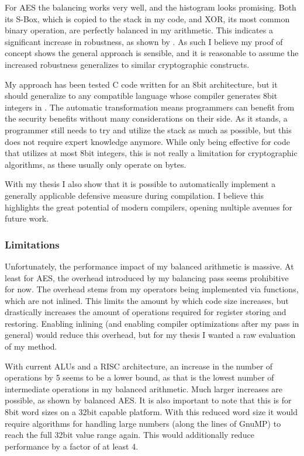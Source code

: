 For AES the balancing works very well, and the histogram looks promising.
Both its S-Box, which is copied to the stack in my code, and XOR, its most common binary operation, are perfectly balanced in my arithmetic.
This indicates a significant increase in robustness, as shown by .
As such I believe my proof of concept shows the general approach is sensible, and it is reasonable to assume the increased robustness generalizes to similar cryptographic constructs.

My approach has been tested C code written for an 8bit architecture, but it should generalize to any \llvm{} compatible language whose compiler generates 8bit integers in \ir{}.
The automatic transformation means programmers can benefit from the security benefits without many considerations on their side.
As it stands, a programmer still needs to try and utilize the stack as much as possible, but this does not require expert knowledge anymore.
While only being effective for code that utilizes at most 8bit integers, this is not really a limitation for cryptographic algorithms, as these usually only operate on bytes.

With my thesis I also show that it is possible to automatically implement a generally applicable defensive measure during compilation.
I believe this highlights the great potential of modern compilers, opening multiple avenues for future work.

\subsubsection{Limitations}
Unfortunately, the performance impact of my balanced arithmetic is massive.
At least for AES, the overhead introduced by my balancing pass seems prohibitive for now.
The overhead stems from my operators being implemented via functions, which are not inlined.
This limits the amount by which code size increases, but drastically increases the amount of operations required for register storing and restoring.
Enabling inlining (and enabling compiler optimizations after my pass in general) would reduce this overhead, but for my thesis I wanted a raw evaluation of my method.

With current ALUs and a RISC architecture, an increase in the number of operations by 5 seems to be a lower bound, as that is the lowest number of intermediate operations in my balanced arithmetic.
Much larger increases are possible, as shown by balanced AES.
It is also important to note that this is for 8bit word sizes on a 32bit capable platform.
With this reduced word size it would require algorithms for handling large numbers (along the lines of GnuMP\cite{granlund1996gnu}) to reach the full 32bit value range again.
This would additionally reduce performance by a factor of at least 4.


